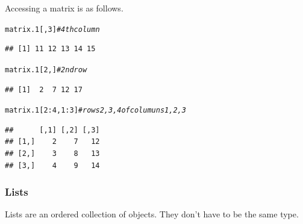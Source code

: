 \documentclass[draft]{article}\usepackage[]{graphicx}\usepackage[]{color}
\makeatletter
\newcommand{\hlnum}[1]{\textcolor[rgb]{0.686,0.059,0.569}{#1}}%
\newcommand{\hlcom}[1]{\textcolor[rgb]{0.678,0.584,0.686}{\textit{#1}}}%
\newcommand{\hlopt}[1]{\textcolor[rgb]{0,0,0}{#1}}%
\newcommand{\hlstd}[1]{\textcolor[rgb]{0.345,0.345,0.345}{#1}}%
\newenvironment{kframe}{%
 \def\at@end@of@kframe{}%
 \ifinner\ifhmode%
  \def\at@end@of@kframe{\end{minipage}}%
  \begin{minipage}{\columnwidth}%
 \fi\fi%
 \def\FrameCommand##1{\hskip\@totalleftmargin \hskip-\fboxsep
 \colorbox{shadecolor}{##1}\hskip-\fboxsep
     \hskip-\linewidth \hskip-\@totalleftmargin \hskip\columnwidth}%
 \MakeFramed {\advance\hsize-\width
   \@totalleftmargin\z@ \linewidth\hsize
   \@setminipage}}%
 {\par\unskip\endMakeFramed%
 \at@end@of@kframe}
\newenvironment{knitrout}{}{} %
\makeatother
\begin{document}
    Accessing a matrix is as follows.
    
\begin{knitrout}
\color{fgcolor}\begin{kframe}
\begin{alltt}
  \hlstd{matrix.1[,}\hlnum{3}\hlstd{]}  \hlcom{# 4th column}
\end{alltt}
\begin{verbatim}
## [1] 11 12 13 14 15
\end{verbatim}
\begin{alltt}
  \hlstd{matrix.1[}\hlnum{2}\hlstd{,]}  \hlcom{# 2nd row}
\end{alltt}
\begin{verbatim}
## [1]  2  7 12 17
\end{verbatim}
\begin{alltt}
  \hlstd{matrix.1[}\hlnum{2}\hlopt{:}\hlnum{4}\hlstd{,} \hlnum{1}\hlopt{:}\hlnum{3}\hlstd{]} \hlcom{# rows 2, 3 ,4 of columuns 1, 2, 3}
\end{alltt}
\begin{verbatim}
##      [,1] [,2] [,3]
## [1,]    2    7   12
## [2,]    3    8   13
## [3,]    4    9   14
\end{verbatim}
\end{kframe}
\end{knitrout}
    
    \subsubsection*{Lists}
    
    Lists are an ordered collection of objects. They don't have to be the same type.
    
\end{document}
